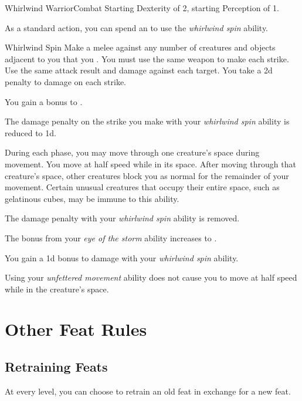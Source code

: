     \begin{feat}{Whirlwind Warrior}{Combat}
        \featpres Starting Dexterity of 2, starting Perception of 1.

         As a standard action, you can spend an  to use the \textit{whirlwind spin} ability.
        \begin{ability}{Whirlwind Spin}
            Make a melee  against any number of creatures and objects adjacent to you that you .
            You must use the same weapon to make each strike.
            Use the same attack result and damage against each target.
            You take a \minus2d penalty to damage on each strike.
        \end{ability}

         You gain a  bonus to .

         The damage penalty on the strike you make with your \textit{whirlwind spin} ability is reduced to \minus1d.

         During each phase, you may move through one creature's space during movement.
        You move at half speed while in its space.
        After moving through that creature's space, other creatures block you as normal for the remainder of your movement.
        Certain unusual creatures that occupy their entire space, such as gelatinous cubes, may be immune to this ability.

         The damage penalty with your \textit{whirlwind spin} ability is removed.

         The bonus from your \textit{eye of the storm} ability increases to .

         You gain a \plus1d bonus to damage with your \textit{whirlwind spin} ability.

         Using your \textit{unfettered movement} ability does not cause you to move at half speed while in the creature's space.
    \end{feat}

\section{Other Feat Rules}

    \subsection{Retraining Feats}
        At every level, you can choose to retrain an old feat in exchange for a new feat.
